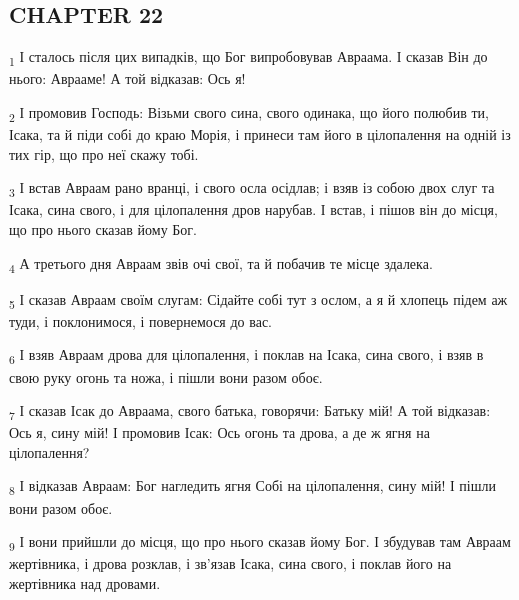 \subsection{CHAPTER 22}
\begin{tcolorbox}
\textsubscript{1} І сталось після цих випадків, що Бог випробовував Авраама. І сказав Він до нього: Аврааме! А той відказав: Ось я!
\end{tcolorbox}
\begin{tcolorbox}
\textsubscript{2} І промовив Господь: Візьми свого сина, свого одинака, що його полюбив ти, Ісака, та й піди собі до краю Морія, і принеси там його в цілопалення на одній із тих гір, що про неї скажу тобі.
\end{tcolorbox}
\begin{tcolorbox}
\textsubscript{3} І встав Авраам рано вранці, і свого осла осідлав; і взяв із собою двох слуг та Ісака, сина свого, і для цілопалення дров нарубав. І встав, і пішов він до місця, що про нього сказав йому Бог.
\end{tcolorbox}
\begin{tcolorbox}
\textsubscript{4} А третього дня Авраам звів очі свої, та й побачив те місце здалека.
\end{tcolorbox}
\begin{tcolorbox}
\textsubscript{5} І сказав Авраам своїм слугам: Сідайте собі тут з ослом, а я й хлопець підем аж туди, і поклонимося, і повернемося до вас.
\end{tcolorbox}
\begin{tcolorbox}
\textsubscript{6} І взяв Авраам дрова для цілопалення, і поклав на Ісака, сина свого, і взяв в свою руку огонь та ножа, і пішли вони разом обоє.
\end{tcolorbox}
\begin{tcolorbox}
\textsubscript{7} І сказав Ісак до Авраама, свого батька, говорячи: Батьку мій! А той відказав: Ось я, сину мій! І промовив Ісак: Ось огонь та дрова, а де ж ягня на цілопалення?
\end{tcolorbox}
\begin{tcolorbox}
\textsubscript{8} І відказав Авраам: Бог нагледить ягня Собі на цілопалення, сину мій! І пішли вони разом обоє.
\end{tcolorbox}
\begin{tcolorbox}
\textsubscript{9} І вони прийшли до місця, що про нього сказав йому Бог. І збудував там Авраам жертівника, і дрова розклав, і зв'язав Ісака, сина свого, і поклав його на жертівника над дровами.
\end{tcolorbox}
